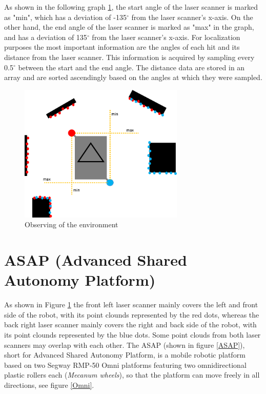 As shown in the following graph \ref{sensor}, the start angle of the laser scanner is marked as "min", which has a deviation of -135$^{\circ}$ from the laser scanner's x-axis. On the other hand, the end angle of the laser scanner is marked as "max" in the graph, and has a deviation of 135$^{\circ}$ from the laser scanner's x-axis. For localization purposes the most important information are the angles of each hit and its distance from the laser scanner. This information is acquired by sampling every 0.5$^{\circ}$ between the start and the end angle. The distance data are stored in an array and are sorted ascendingly based on the angles at which they were sampled.

\begin{figure}[htb]
      \centering
      \includegraphics[width=0.7\textwidth]{graphics/sensoren.png}
      \caption{Observing of the environment}
      \label{sensor}
      \centering
\end{figure}



\section{ASAP (Advanced Shared Autonomy Platform)}
As shown in Figure \ref{sensor} the front left laser scanner mainly covers the left and front side of the robot, with its point clounds represented by the red dots, whereas the back right laser scanner mainly covers the right and back side of the robot, with its point clounds represented by the blue dots. Some point clouds from both laser scanners may overlap with each other. 
The ASAP (shown in figure \ref{ASAP}), short for Advanced Shared Autonomy Platform, is a mobile robotic platform based on two Segway RMP-50 Omni platforms featuring two omnidirectional plastic rollers each (\textit{Mecanum wheels}), so that the platform can move freely in all directions, see figure \ref{Omni}.

